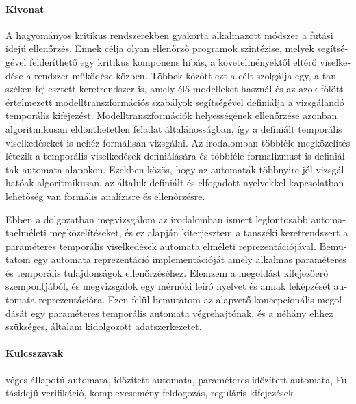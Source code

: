 \begin{otherlanguage}{magyar}

  \paragraph*{Kivonat}
  \thispagestyle{plain}

  A hagyományos kritikus rendszerekben gyakorta alkalmazott módszer a futási idejű ellenőrzés.
  Ennek célja olyan ellenőrző programok szintézise, melyek segítségével felderíthető egy kritikus komponens hibás, a követelményektől eltérő viselkedése a rendszer működése közben.
  Többek között ezt a célt szolgálja egy, a tanszéken fejlesztett keretrendszer is, amely élő modelleket használ és az azok fölött értelmezett modelltranszformációs szabályok segítségével definiálja a vizsgálandó temporális kifejezést.
  Modelltranszformációk helyességének ellenőrzése azonban algoritmikusan eldönthetetlen feladat általánosságban, így a definiált temporális viselkedéseket is nehéz formálisan vizsgálni.
  Az irodalomban többféle megközelítés létezik a temporális viselkedések definiálására és többféle formalizmust is definiáltak automata alapokon.
  Ezekben közös, hogy az automaták többnyire jól vizsgálhatóak algoritmikusan, az általuk definiált és elfogadott nyelvekkel kapcsolatban lehetőség van formális analízisre és ellenőrzésre.
  
  Ebben a dolgozatban megvizsgálom az irodalomban ismert legfontosabb automataelméleti megközelítéseket, és ez alapján kiterjesztem a tanszéki keretrendszert a paraméteres temporális viselkedések automata elméleti reprezentációjával.
  Bemutatom egy automata reprezentáció implementációját amely alkalmas paraméteres és temporális tulajdonságok ellenőrzéséhez. 
  Elemzem a megoldást kifejezőerő szempontjából, és megvizsgálok egy mérnöki leíró nyelvet és annak leképzését automata reprezentációra.
  Ezen felül bemutatom az alapvető koncepcionális megoldását egy paraméteres temporális automata végrehajtónak, és a néhány ehhez szükséges, általam kidolgozott adatszerkezetet.
  
  \paragraph{Kulcsszavak} véges állapotú automata, időzített automata, paraméteres időzített automata, Futásidejű verifikáció, komplexesemény-feldogozás, reguláris kifejezések
\end{otherlanguage}

